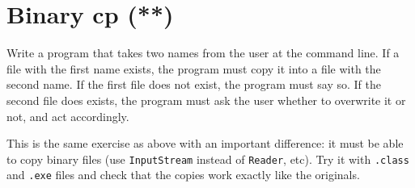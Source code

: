\documentclass{article}
\begin{document}
\section{Binary cp (**)}
\label{sec:binary-cp}

Write a program that takes two names from the user at the command
line. If a file with the first name exists, the program must copy it
into a file with the second name. If the first file does not exist,
the program must say so. If the second file does exists, the program
must ask the user whether to overwrite it or not, and act accordingly.

This is the same exercise as above with an important difference: it
must be able to copy binary files (use \verb+InputStream+ instead of
\verb+Reader+, etc). Try it with \verb+.class+ and \verb+.exe+ files
and check that the copies work exactly like the originals.
\end{document}
